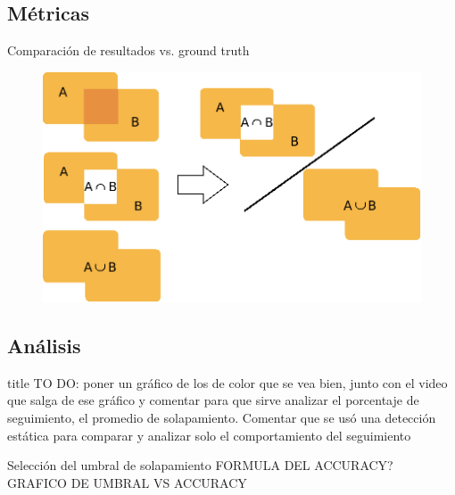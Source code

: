 \documentclass[]{beamer}
\begin{document}
\subsection{Métricas}
\begin{frame}[t]{Comparación de resultados vs. ground truth}
    \begin{figure}[t]
        \centering
        \includegraphics[scale=0.35]{img/pascal/pascal.png}
    \end{figure}
\end{frame}



\subsection{Análisis}
\begin{frame}[t]{title}
    TO DO: poner un gráfico de los de color que se vea bien, junto con el video que salga de ese gráfico y comentar para que sirve analizar el porcentaje de seguimiento, el promedio de solapamiento. Comentar que se usó una detección estática para comparar y analizar solo el comportamiento del seguimiento

\end{frame}



\begin{frame}[t]{Selección del umbral de solapamiento}
    FORMULA DEL ACCURACY?\\
    GRAFICO DE UMBRAL VS ACCURACY\\
\end{frame}
\end{document}

